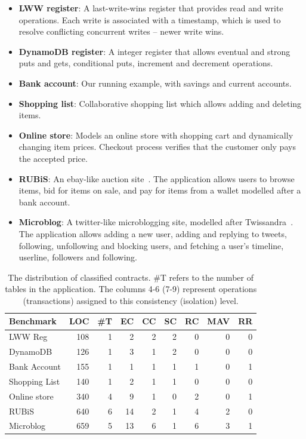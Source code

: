 \begin{itemize}

\item \textbf{LWW register}: A last-write-wins register that provides read and
write operations. Each write is associated with a timestamp, which is used to
resolve conflicting concurrent writes -- newer write wins.

\item \textbf{DynamoDB register}: A integer register that allows eventual and
strong puts and gets, conditional puts, increment and decrement operations.

\item \textbf{Bank account}: Our running example, with savings and current
accounts.

\item \textbf{Shopping list}: Collaborative shopping list which allows adding
and deleting items.

\item \textbf{Online store}: Models an online store with shopping cart and
dynamically changing item prices. Checkout process verifies that the customer
only pays the accepted price.

\item \textbf{RUBiS}: An ebay-like auction site~\cite{RUBiS}. The application
allows users to browse items, bid for items on sale, and pay for items from a
wallet modelled after a bank account.

\item \textbf{Microblog}: A twitter-like microblogging site, modelled after
Twissandra~\cite{Twissandra}. The application allows adding a new user, adding
and replying to tweets, following, unfollowing and blocking users, and fetching
a user's timeline, userline, followers and following.
\end{itemize}

\begin{table}[t]
\caption{The distribution of classified contracts. \#T refers to the number of
tables in the application. The columns 4-6 (7-9) represent operations
(transactions) assigned to this consistency (isolation) level.}
\begin{center}
\begin{tabular} {|l|r|r|r|r|r|r|r|r|}
\hline
{\bf Benchmark} & {\bf LOC} & {\bf \#T} & {\bf EC} & {\bf CC} & {\bf SC} & {\bf RC} & {\bf MAV} & {\bf RR} \\
\hline
{LWW Reg} & 108 & 1 & 2 & 2 & 2 & 0 & 0 & 0 \\
{DynamoDB} & 126 & 1 & 3 & 1 & 2 & 0 & 0 & 0 \\
{Bank Account} & 155 & 1 & 1 & 1 & 1 & 1 & 0 & 1 \\
{Shopping List} & 140 & 1 & 2 & 1 & 1 & 0 & 0 & 0 \\
{Online store} & 340 & 4 & 9 & 1 & 0 & 2 & 0 & 1 \\
{RUBiS} & 640 & 6 & 14 & 2 & 1 & 4 & 2 & 0 \\
{Microblog} & 659 & 5 & 13 & 6 & 1 & 6 & 3 & 1 \\
\hline
\end{tabular}
\end{center}
\label{tab:ctrts}
\end{table}

